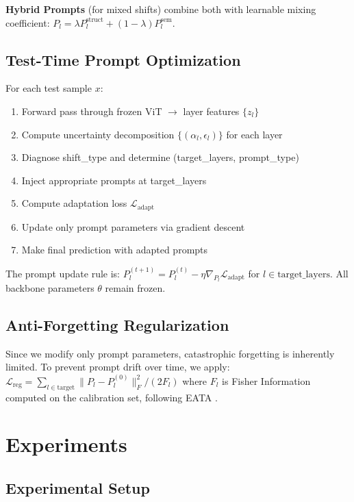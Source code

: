 \documentclass[11pt,a4paper]{article}
\begin{document}
\textbf{Hybrid Prompts} (for mixed shifts) combine both with learnable mixing coefficient: $P_l = \lambda P_l^{\text{struct}} + (1-\lambda) P_l^{\text{sem}}$.

\subsection{Test-Time Prompt Optimization}

For each test sample $x$:
\begin{enumerate}
    \item Forward pass through frozen ViT $\rightarrow$ layer features $\{z_l\}$
    \item Compute uncertainty decomposition $\{(\alpha_l, \epsilon_l)\}$ for each layer
    \item Diagnose shift\_type and determine (target\_layers, prompt\_type)
    \item Inject appropriate prompts at target\_layers
    \item Compute adaptation loss $\mathcal{L}_{\text{adapt}}$
    \item Update only prompt parameters via gradient descent
    \item Make final prediction with adapted prompts
\end{enumerate}

The prompt update rule is: $P_l^{(t+1)} = P_l^{(t)} - \eta \nabla_{P_l} \mathcal{L}_{\text{adapt}}$ for $l \in \text{target\_layers}$. All backbone parameters $\theta$ remain frozen.

\subsection{Anti-Forgetting Regularization}

Since we modify only prompt parameters, catastrophic forgetting is inherently limited. To prevent prompt drift over time, we apply: $\mathcal{L}_{\text{reg}} = \sum_{l \in \text{target}} \|P_l - P_l^{(0)}\|_F^2 / (2F_l)$ where $F_l$ is Fisher Information computed on the calibration set, following EATA \citep{niu2022eata}.

\section{Experiments}

\subsection{Experimental Setup}
\end{document}
